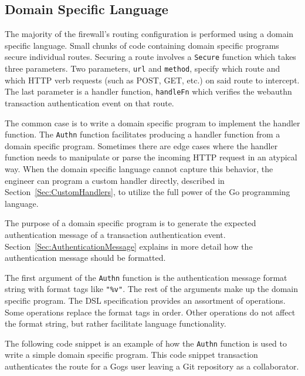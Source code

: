 
\subsection{Domain Specific Language}\label{Sec:DomainSpecificLanguage}

The majority of the firewall's routing configuration is performed using a domain specific language. Small chunks of code containing domain specific programs secure individual routes. Securing a route involves a \lstinline{Secure} function which takes three parameters. Two parameters, \lstinline{url} and \lstinline{method}, specify which route and which HTTP verb requests (such as POST, GET, etc.) on said route to intercept. The last parameter is a handler function, \lstinline{handleFn} which verifies the webauthn transaction authentication event on that route. 

The common case is to write a domain specific program to implement the handler function. The \lstinline{Authn} function facilitates producing a handler function from a domain specific program. Sometimes there are edge cases where the handler function needs to manipulate or parse the incoming HTTP request in an atypical way. When the domain specific language cannot capture this behavior, the engineer can program a custom handler directly, described in Section~\ref{Sec:CustomHandlers}, to utilize the full power of the Go programming language.

The purpose of a domain specific program is to generate the expected authentication message of a transaction authentication event. Section~\ref{Sec:AuthenticationMessage} explains in more detail how the authentication message should be formatted. 

The first argument of the \lstinline{Authn} function is the authentication message format string with format tags like \lstinline{"%v"}. The rest of the arguments make up the domain specific program. The DSL specification provides an assortment of operations. Some operations replace the format tags in order. Other operations do not affect the format string, but rather facilitate language functionality.

The following code snippet is an example of how the \lstinline{Authn} function is used to write a simple domain specific program. This code snippet transaction authenticates the route for a Gogs user leaving a Git repository as a collaborator. 

